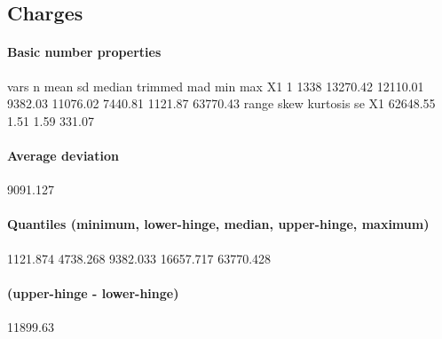 \documentclass{article}
\begin{document}
\subsection{Charges}

\paragraph{Basic number properties \newline} 

\begin{Schunk}
\begin{Soutput}
   vars    n     mean       sd  median  trimmed     mad     min      max
X1    1 1338 13270.42 12110.01 9382.03 11076.02 7440.81 1121.87 63770.43
      range skew kurtosis     se
X1 62648.55 1.51     1.59 331.07
\end{Soutput}
\end{Schunk}

\paragraph{Average deviation \newline} 

\begin{Schunk}
\begin{Soutput}
[1] 9091.127
\end{Soutput}
\end{Schunk}
\paragraph{Quantiles (minimum, lower-hinge, median, upper-hinge, maximum) \newline} 
\begin{Schunk}
\begin{Soutput}
[1]  1121.874  4738.268  9382.033 16657.717 63770.428
\end{Soutput}
\end{Schunk}

\paragraph{ (upper-hinge - lower-hinge) \newline} 
\begin{Schunk}
\begin{Soutput}
[1] 11899.63
\end{Soutput}
\end{Schunk}
\end{document}

